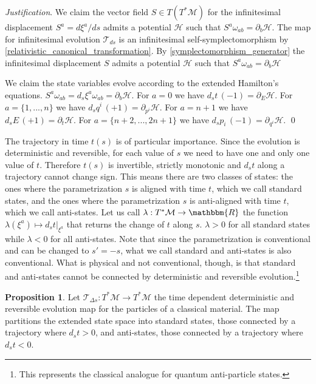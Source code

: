 \documentclass[aps,pra,10pt,twocolumn,floatfix,nofootinbib]{revtex4-1}
\numberwithin{equation}{section}
\theoremstyle{definition}
\newtheorem{prop}[equation]{Proposition}
\newenvironment{justification}{\emph{Justification}.}{\qed}
\begin{document}
\begin{justification}
We claim the vector field $S \in T(T^*\mathcal{M})$ for the infinitesimal displacement $S^a = d\xi^a/ds$ admits a potential $\mathcal{H}$ such that $S^{a} \omega_{ab} = \partial_{b}\mathcal{H}$. The map for infinitesimal evolution $\mathcal{T}_{ds}$ is an infinitesimal self-symplectomorphism by \ref{relativistic_canonical_transformation}. By \ref{symplectomorphism_generator} the infinitesimal displacement $S$ admits a potential $\mathcal{H}$ such that $S^{a} \omega_{ab} = \partial_{b}\mathcal{H}$

We claim the state variables evolve according to the extended Hamilton's equations. $S^{a} \omega_{ab} = d_s\xi^a \omega_{ab} = \partial_{b}\mathcal{H}$. For $a = 0$ we have $d_s t \, (-1) = \partial_{E} \mathcal{H}$. For  $a=\{1,...,n\}$ we have $d_s q^i \, (+1) = \partial_{p^i} \mathcal{H}$. For $a=n+1$ we have $d_s E \, (+1) = \partial_{t} \mathcal{H}$. For $a=\{n+2,...,2n + 1\}$ we have $d_s p_i \, (-1) = \partial_{q^i} \mathcal{H}$.
\end{justification}

The trajectory in time $t(s)$ is of particular importance. Since the evolution is deterministic and reversible, for each value of $s$ we need to have one and only one value of $t$. Therefore $t(s)$ is invertible, strictly monotonic and $d_{s}t$ along a trajectory cannot change sign. This means there are two classes of states: the ones where the parametrization $s$ is aligned with time $t$, which we call standard states, and the ones where the parametrization $s$ is anti-aligned with time $t$, which we call anti-states. Let us call $\lambda : T^*\mathcal{M} \rightarrow \mathbbm{R}$ the function $\lambda (\xi^a) \mapsto d_s t |_{\xi^a}$ that returns the change of $t$ along $s$. $\lambda > 0$ for all standard states while $\lambda < 0$ for all anti-states.  Note that since the parametrization is conventional and can be changed to $s'=-s$, what we call standard and anti-states is also conventional. What is physical and not conventional, though, is that standard and anti-states cannot be connected by deterministic and reversible evolution.\footnote{This represents the classical analogue for quantum anti-particle states.}

\begin{prop}\label{antistates}
	Let $\mathcal{T}_{\Delta s}: T^*\mathcal{M} \rightarrow T^*\mathcal{M}$ the time dependent deterministic and reversible evolution map for the particles of a classical material. The map partitions the extended state space into standard states, those connected by a trajectory where $d_{s}t>0$, and anti-states, those connected by a trajectory where $d_{s}t<0$.
\end{prop}
\end{document}
